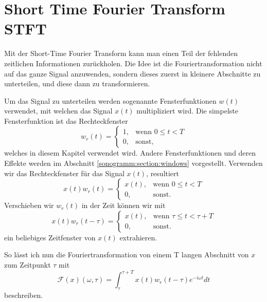 %
%
%
%
\section{Short Time Fourier Transform STFT\label{sonogramm:section:teil0}}
Mit der Short-Time Fourier Transform kann man einen Teil der fehlenden zeitlichen Informationen zurückholen.
Die Idee ist die Fouriertransformation nicht auf das ganze Signal anzuwenden, sondern dieses zuerst in kleinere
Abschnitte zu unterteilen, und diese dann zu transformieren.

Um das Signal zu unterteilen werden sogenannte Fensterfunktionen $w(t)$ verwendet, mit welchen das Signal
$x(t)$ multipliziert wird.
Die simpelste Fensterfunktion ist das Rechteckfenster
\begin{equation}
    w_r(t) = 
        \begin{cases}
        1,& \text{wenn } 0 \le t < T\\
        0, & \text{sonst, }
        \end{cases}
\end{equation}
welches in diesem Kapitel verwendet wird.
Andere Fensterfunktionen und deren Effekte werden im Abschnitt \ref{sonogramm:section:windows} vorgestellt.
Verwenden wir das Rechteckfenster für das Signal $x(t)$, resultiert 
\begin{equation}
    x(t) w_r(t) = 
    \begin{cases}
    x(t),& \text{wenn } 0 \le t < T\\
    0, & \text{sonst.}
    \end{cases}
\end{equation}
Verschieben wir $w_r(t)$ in der Zeit können wir mit 
\begin{equation}
    x(t) w_r(t-\tau) = 
    \begin{cases}
        x(t),& \text{wenn } \tau \le t < \tau + T\\
        0, & \text{sonst.}
    \end{cases}
\end{equation}
ein beliebiges Zeitfenster von $x(t)$ extrahieren.

So lässt ich nun die Fouriertransformation von einem T langen Abschnitt
von $x$ zum Zeitpunkt $\tau$ mit
\begin{equation}
    \mathscr{F}(x)(\omega, \tau) = \int_{\tau}^{\tau+T} x(t) w_r(t - \tau) e^{-i \omega t} dt
\end{equation}
beschreiben.

